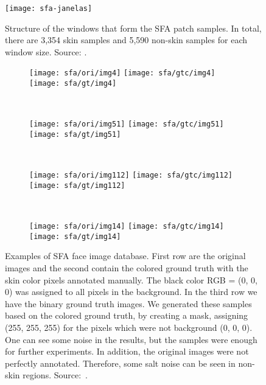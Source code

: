 \begin{figure}[H]
  \centering
  \texttt{[image: sfa-janelas]}
  \caption[Structure of the windows that form the SFA patch samples]{Structure of the windows that form the SFA patch samples. In total, there are 3,354 skin samples and 5,590 non-skin samples for each window size. Source: \citet{sfa-skin-dataset:13}.}
  \label{fig:sfa_dataset_janelas}
\end{figure}

\begin{figure}[H]
    \centering
    \begin{subfigure}[t]{0.2\textwidth}
        \texttt{[image: sfa/ori/img4]}
        \texttt{[image: sfa/gtc/img4]}
        \texttt{[image: sfa/gt/img4]}
    \end{subfigure}
    ~
    \begin{subfigure}[t]{0.2\textwidth}
        \texttt{[image: sfa/ori/img51]}
        \texttt{[image: sfa/gtc/img51]}
        \texttt{[image: sfa/gt/img51]}
    \end{subfigure}
    ~
    \begin{subfigure}[t]{0.2\textwidth}
        \texttt{[image: sfa/ori/img112]}
        \texttt{[image: sfa/gtc/img112]}
        \texttt{[image: sfa/gt/img112]}
    \end{subfigure}
    ~ %
    \begin{subfigure}[t]{0.2\textwidth}
        \texttt{[image: sfa/ori/img14]}
        \texttt{[image: sfa/gtc/img14]}
        \texttt{[image: sfa/gt/img14]}
    \end{subfigure}
    \caption[Examples of SFA face image database]{Examples of SFA face image database. First row are the original images and the second contain the colored ground truth with the skin color pixels annotated manually. The black color RGB = (0, 0, 0) was assigned to all pixels in the background. In the third row we have the binary ground truth images. We generated these samples based on the colored ground truth, by creating a mask, assigning (255, 255, 255) for the pixels which were not background (0, 0, 0). One can see some noise in the results, but the samples were enough for further experiments. In addition, the original images were not perfectly annotated. Therefore, some salt noise can be seen in non-skin regions. Source:~\citet{sfa-skin-dataset:13}.}
    \label{fig:sfa_dataset_exemplo}
\end{figure}

